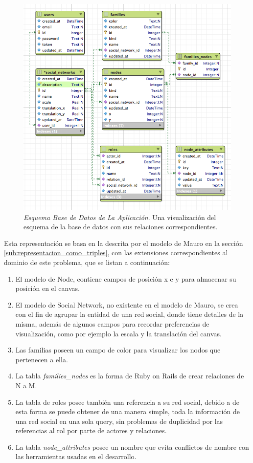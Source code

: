 \begin{figure}[H]
  \centering
  \includegraphics[width=1.0\textwidth]{images/schema_db.png}
  \caption[Esquema Base de Datos de La Aplicación]{\emph{Esquema Base de Datos de La Aplicación}. Una visualización del esquema de la base de datos con sus relaciones correspondientes.}
  \label{schema_db}
\end{figure}

Esta representación se basa en la descrita por el modelo de Mauro en la sección \ref{sub:representacion_como_triples}, con las extensiones correspondientes al dominio de este problema, que se listan a continuación:

  \begin{enumerate}
    \item El modelo de Node, contiene campos de posición x e y para almacenar su posición en el canvas.
    \item El modelo de Social Network, no existente en el modelo de Mauro, se crea con el fin de agrupar la entidad de una red social, donde tiene detalles de la misma, además de algunos campos para recordar preferencias de visualización, como por ejemplo la escala y la translación del canvas.
    \item Las familias poseen un campo de color para visualizar los nodos que pertenecen a ella.
    \item La tabla \emph{families\_nodes} es la forma de Ruby on Rails de crear relaciones de N a M.
    \item La tabla de roles posee también una referencia a su red social, debido a de esta forma se puede obtener de una manera simple, toda la información de una red social en una sola query, sin problemas de duplicidad por las referencias al rol por parte de actores y relaciones.
    \item La tabla \emph{node\_attributes} posee un nombre que evita conflictos de nombre con las herramientas usadas en el desarrollo.
  \end{enumerate}

